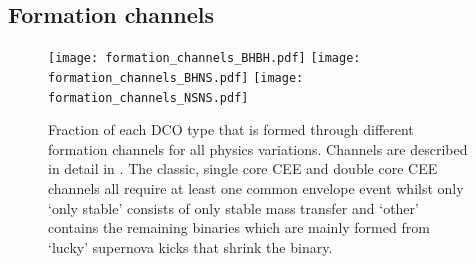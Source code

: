\subsection{Formation channels}

\begin{figure}
    \centering
    \texttt{[image: formation\_channels\_BHBH.pdf]}
    \texttt{[image: formation\_channels\_BHNS.pdf]}
    \texttt{[image: formation\_channels\_NSNS.pdf]}
    \caption{Fraction of each DCO type that is formed through different formation channels for all physics variations. Channels are described in detail in \citet{Broekgaarden+2021}. The classic, single core CEE and double core CEE channels all require at least one common envelope event whilst only `only stable' consists of only stable mass transfer and `other' contains the remaining binaries which are mainly formed from `lucky' supernova kicks that shrink the binary. }
    \label{fig:formation_channels}
\end{figure}